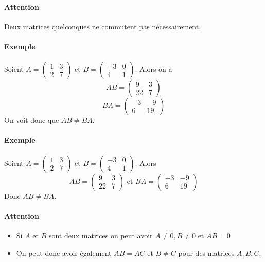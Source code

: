 \paragraph{Attention} Deux matrices quelconques ne commutent pas nécessairement.
\paragraph{Exemple} Soient $A = \begin{pmatrix} 1 & 3 \\ 2 & 7 \end{pmatrix}$ et $B = \begin{pmatrix} -3 & 0 \\ 4 & 1 \end{pmatrix}$. Alors on a
$$A B = \begin{pmatrix} 9 & 3 \\ 22 & 7 \end{pmatrix}$$
$$B A = \begin{pmatrix} -3 & -9 \\ 6 & 19 \end{pmatrix}$$
On voit donc que $A B \neq B A$.

\paragraph{Exemple} Soient $A=\begin{pmatrix} 1 & 3 \\ 2 & 7 \end{pmatrix}$ et $B=\begin{pmatrix} -3 & 0 \\ 4 & 1 \end{pmatrix}$. Alors 
$$A B = 
\begin{pmatrix}
  9 & 3 \\
  22 & 7
\end{pmatrix} \text{ et } B A = 
\begin{pmatrix}
  -3 & -9 \\
  6 & 19
\end{pmatrix}$$ 
Donc $A B\neq B A$.

\paragraph{Attention}
\begin{itemize}
  \item Si $A$ et $B$ sont deux matrices on peut avoir $A \neq 0, B \neq 0$ et $AB = 0$
  \item On peut donc avoir également $AB = AC$ et $B \neq C$ pour des matrices $A, B, C$.
\end{itemize}

